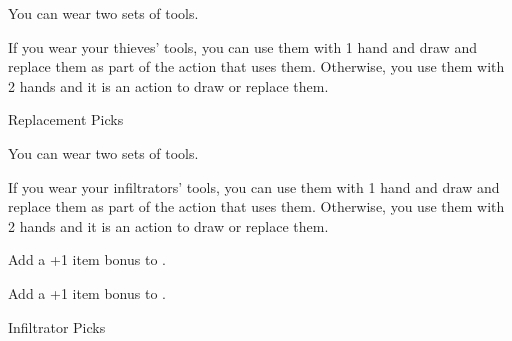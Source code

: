 


{\footnotesize
You can wear two sets of tools.

If you wear your thieves' tools, you can use them with 1 hand and draw and replace them as part of the action that uses them.
Otherwise, you use them with 2 hands and it is an action to draw or replace them.
}


Replacement Picks \ItemPrice{3sp}

\vfill




{\footnotesize
You can wear two sets of tools.

If you wear your infiltrators' tools, you can use them with 1 hand and draw and replace them as part of the action that uses them.
Otherwise, you use them with 2 hands and it is an action to draw or replace them.
}


Add a +1 item bonus to .


Add a +1 item bonus to .

Infiltrator Picks 

\vfill


